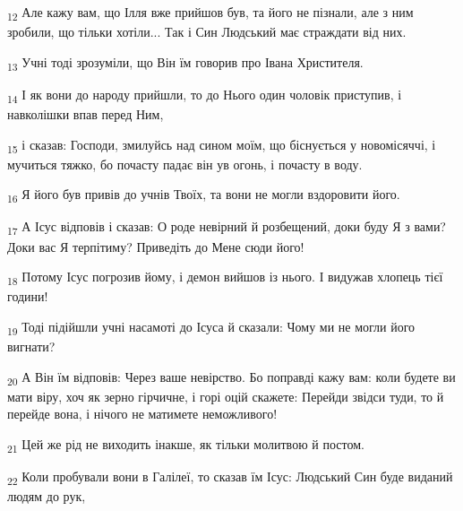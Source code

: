 \begin{tcolorbox}
\textsubscript{12} Але кажу вам, що Ілля вже прийшов був, та його не пізнали, але з ним зробили, що тільки хотіли... Так і Син Людський має страждати від них.
\end{tcolorbox}
\begin{tcolorbox}
\textsubscript{13} Учні тоді зрозуміли, що Він їм говорив про Івана Христителя.
\end{tcolorbox}
\begin{tcolorbox}
\textsubscript{14} І як вони до народу прийшли, то до Нього один чоловік приступив, і навколішки впав перед Ним,
\end{tcolorbox}
\begin{tcolorbox}
\textsubscript{15} і сказав: Господи, змилуйсь над сином моїм, що біснується у новомісяччі, і мучиться тяжко, бо почасту падає він ув огонь, і почасту в воду.
\end{tcolorbox}
\begin{tcolorbox}
\textsubscript{16} Я його був привів до учнів Твоїх, та вони не могли вздоровити його.
\end{tcolorbox}
\begin{tcolorbox}
\textsubscript{17} А Ісус відповів і сказав: О роде невірний й розбещений, доки буду Я з вами? Доки вас Я терпітиму? Приведіть до Мене сюди його!
\end{tcolorbox}
\begin{tcolorbox}
\textsubscript{18} Потому Ісус погрозив йому, і демон вийшов із нього. І видужав хлопець тієї години!
\end{tcolorbox}
\begin{tcolorbox}
\textsubscript{19} Тоді підійшли учні насамоті до Ісуса й сказали: Чому ми не могли його вигнати?
\end{tcolorbox}
\begin{tcolorbox}
\textsubscript{20} А Він їм відповів: Через ваше невірство. Бо поправді кажу вам: коли будете ви мати віру, хоч як зерно гірчичне, і горі оцій скажете: Перейди звідси туди, то й перейде вона, і нічого не матимете неможливого!
\end{tcolorbox}
\begin{tcolorbox}
\textsubscript{21} Цей же рід не виходить інакше, як тільки молитвою й постом.
\end{tcolorbox}
\begin{tcolorbox}
\textsubscript{22} Коли пробували вони в Галілеї, то сказав їм Ісус: Людський Син буде виданий людям до рук,
\end{tcolorbox}
